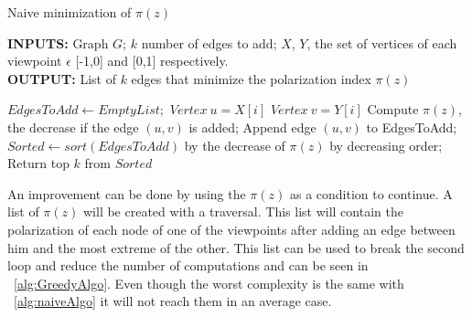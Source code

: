 \vspace{10pt}

\begin{algorithm}[htbp]
	\caption{Naive minimization of $\pi(z)$}
	\label{alg:naiveAlgo}
	\begin{flushleft}
        		\textbf{INPUTS:} Graph $G$; $k$ number of edges to add;
		$X$, $Y $, the set of vertices of each viewpoint $\epsilon$ [-1,0] and [0,1] respectively.\\
		\vspace{6pt}
        		\textbf{OUTPUT:} List of $k$ edges that minimize the polarization index $\pi(z)$
	\end{flushleft}
	\begin{algorithmic}[1]
		\STATE $EdgesToAdd \leftarrow Empty List;$
		\STATE $Vertex \ u = X[i]$
		\STATE $Vertex \ v = Y[i]$
			\STATE Compute $\pi(z)$, the decrease if the edge $(u,v)$ is added;
			\STATE Append edge $(u,v)$ to EdgesToAdd;
		\ENDIF
		\ENDFOR
		\ENDFOR
		\STATE $Sorted \leftarrow sort(EdgesToAdd)$ by the decrease of $\pi(z)$ by decreasing order;
		\STATE Return top $k$ from $Sorted$
	\end{algorithmic}
\end{algorithm}

An improvement can be done by using the $\pi(z)$ as a condition to continue. A list of $\pi(z)$ will be created with a traversal. This list will contain the polarization of each node of one of the viewpoints after adding an edge between him and the most extreme of the other.
This list can be used to break the second loop and reduce the number of computations and can be seen in ~\ref{alg:GreedyAlgo}. Even though the worst complexity is the same with ~\ref{alg:naiveAlgo} it will not reach them in an average case.

